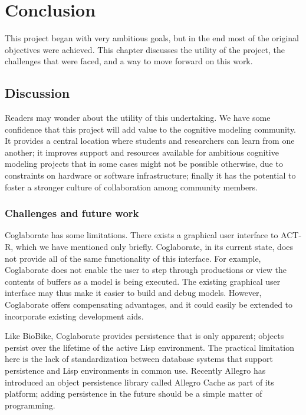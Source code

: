 \chapter{Conclusion}
\label{chap-seven}

This project began with very ambitious goals, but in the end most of
the original objectives were achieved.  This chapter discusses the
utility of the project, the challenges that were faced, and a way
to move forward on this work.

\section{Discussion}

Readers may wonder about the utility of this undertaking. We have some
confidence that this project will add value to the cognitive modeling
community. It provides a central location where students and
researchers can learn from one another; it improves support and
resources available for ambitious cognitive modeling projects that in
some cases might not be possible otherwise, due to constraints on
hardware or software infrastructure; finally it has the potential to
foster a stronger culture of collaboration among community members.

\subsection{Challenges and future work}


Coglaborate has some limitations.
%
There exists a graphical user interface to ACT-R, which we have
mentioned only briefly.  Coglaborate, in its current state, does not
provide all of the same functionality of this interface.  For example,
Coglaborate does not enable the user to step through productions or
view the contents of buffers as a model is being executed.  The
existing graphical user interface may thus make it easier to build and
debug models.  However, Coglaborate offers compensating advantages,
and it could easily be extended to incorporate existing development
aids.

Like BioBike, Coglaborate provides persistence that is only apparent;
objects persist over the lifetime of the active Lisp environment.  The
practical limitation here is the lack of standardization between
database systems that support persistence and Lisp environments in
common use.  Recently Allegro has introduced an object persistence
library called Allegro Cache as part of its platform; adding
persistence in the future should be a simple matter of programming.

